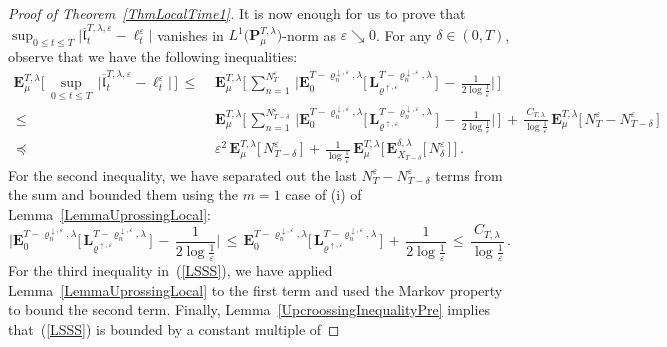 \documentclass[10pt]{article}
\numberwithin{equation}{section}
\theoremstyle{definition}
\begin{document}
\begin{proof}[Proof of Theorem~\ref{ThmLocalTime1}]
It is now enough for us to prove that $\sup_{0\leq t\leq T}\big|\overline{\mathfrak{l}}_{t}^{T,\lambda,\varepsilon}-\ell_{t}^{\varepsilon} \big|$ vanishes in $L^1\big(\mathbf{P}_{\mu}^{T,\lambda}\big)$-norm as $\varepsilon \searrow 0$. For any $\delta\in (0,T)$, observe that we have the following inequalities:
\begin{align}\label{LSSS}
\mathbf{E}_{\mu}^{T,\lambda}\bigg[\,\sup_{0\leq t\leq T}\,\Big|\overline{\mathfrak{l}}_{t}^{T,\lambda,\varepsilon}-\ell_{t}^{\varepsilon} \Big|\,\bigg]\nonumber   \,\leq \,&\,
\mathbf{E}_{\mu}^{T,\lambda}\Bigg[\,\sum_{n=1}^{ N_{T}^{\varepsilon} } \, \Bigg|\mathbf{E}_{0}^{T-\varrho_{n}^{\downarrow ,\varepsilon},\lambda}\Big[\,\mathbf{L}_{\varrho^{\uparrow,\varepsilon}}^{T-\varrho_{n}^{\downarrow ,\varepsilon},\lambda}  \,\Big] \,-\,\frac{  1}{2\log \frac{1}{\varepsilon}}\Bigg|\,\Bigg] \nonumber \\
\,\leq \,&\,
\mathbf{E}_{\mu}^{T,\lambda}\Bigg[\,\sum_{n=1}^{ N_{T-\delta}^{\varepsilon} }  \,\Bigg|\mathbf{E}_{0}^{T-\varrho_{n}^{\downarrow ,\varepsilon},\lambda}\Big[\,\mathbf{L}_{\varrho^{\uparrow,\varepsilon}}^{T-\varrho_{n}^{\downarrow ,\varepsilon},\lambda} \,\Big] \,-\,\frac{  1}{2\log \frac{1}{\varepsilon}}\Bigg|\,\Bigg] \, +\,\frac{C_{T,\lambda} }{\log \frac{1}{\varepsilon} }\,\mathbf{E}_{\mu}^{T,\lambda}\big[\, N_{T}^{\varepsilon}-N_{T-\delta}^{\varepsilon}  \, \big] \nonumber 
 \\
\,\preceq \,&\,
\varepsilon^2\,\mathbf{E}_{\mu}^{T,\lambda}\big[ \, N_{T-\delta}^{\varepsilon}\, \big] \, +\,\frac{1}{\log \frac{1}{\varepsilon}  }\,\mathbf{E}_{\mu}^{T,\lambda}\Big[\, \mathbf{E}_{X_{T-\delta}}^{\delta,\lambda}\big[\,  N_{\delta}^{\varepsilon} \,  \big]  \,  \Big] 
\,.
\end{align}
For the second inequality, we have separated  out the last $N_{T}^{\varepsilon}-N_{T-\delta}^{\varepsilon} $ terms from the sum and bounded them using the $m=1$ case of (i) of Lemma~\ref{LemmaUprossingLocal}: 
$$ \Bigg|\mathbf{E}_{0}^{T-\varrho_{n}^{\downarrow ,\varepsilon},\lambda}\Big[\,\mathbf{L}_{\varrho^{\uparrow,\varepsilon}}^{T-\varrho_{n}^{\downarrow ,\varepsilon},\lambda} \,\Big] \,-\,\frac{  1}{2\log \frac{1}{\varepsilon}}\Bigg|\,\leq\, \mathbf{E}_{0}^{T-\varrho_{n}^{\downarrow ,\varepsilon},\lambda}\Big[\,\mathbf{L}_{\varrho^{\uparrow,\varepsilon}}^{T-\varrho_{n}^{\downarrow ,\varepsilon},\lambda}\, \Big] \,+\,\frac{  1}{2\log \frac{1}{\varepsilon}} \,\leq \, \frac{  C_{T,\lambda} }{ \log \frac{1}{\varepsilon} } \,. $$
For the third inequality in~(\ref{LSSS}), we have applied Lemma~\ref{LemmaUprossingLocal} to the first term and used the Markov property to bound the second term.  Finally, Lemma~\ref{UpcroossingInequalityPre} implies that~(\ref{LSSS}) is bounded  by a constant multiple of 

\end{proof}
\end{document}

